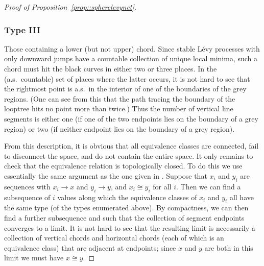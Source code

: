 \documentclass[10pt]{amsart}
\let\oldS\S
\theoremstyle{plain}
\numberwithin{theorem}{section}
\theoremstyle{definition}
\renewcommand{\S}{{\mathbf S}}
\begin{document}
\begin{proof}[Proof of Proposition~\ref{prop::spherelevynet}]
\subsubsection*{Type III}
Those containing a lower (but not upper) chord. Since stable Lévy processes with only downward jumps have a countable collection of unique local minima, such a chord must hit the black curves in either two or three places. In the (a.s.\ countable) set of places where the latter occurs, it is not hard to see that the rightmost point is a.s.\ in the interior of one of the boundaries of the grey regions. (One can see from this that the path tracing the boundary of the looptree hits no point more than twice.) Thus the number of vertical line segments is either one (if one of the two endpoints lies on the boundary of a grey region) or two (if neither endpoint lies on the boundary of a grey region).

\medskip
From this description, it is obvious that all equivalence classes are connected, fail to disconnect the space, and do not contain the entire space. It only remains to check that the equivalence relation is topologically closed. To do this we use essentially the same argument as the one given in \cite[\oldS 1.1]{matingtrees}. Suppose that $x_i$ and $y_i$ are sequences with $x_i \to x$ and $y_i \to y$, and $x_i \cong y_i$ for all $i$. Then we can find a subsequence of $i$ values along which the equivalence classes of $x_i$ and $y_i$ all have the same type (of the types enumerated above). By compactness, we can then find a further subsequence and such that the collection of segment endpoints converges to a limit. It is not hard to see that the resulting limit is necessarily a collection of vertical chords and horizontal chords (each of which is an equivalence class) that are adjacent at endpoints; since $x$ and $y$ are both in this limit we must have $x \cong y$.
\end{proof}
\end{document}
